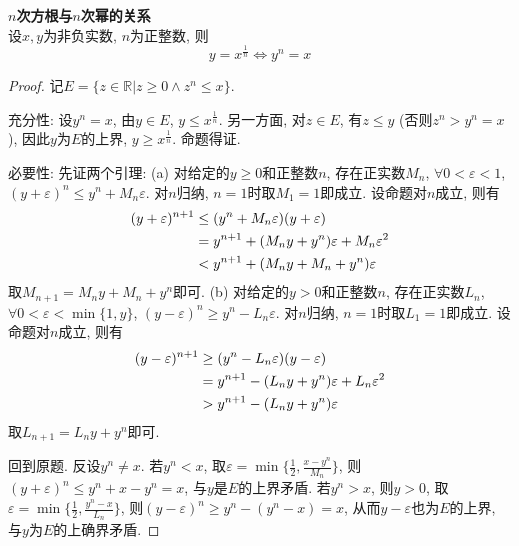 \begin{lem} \textbf{$n$次方根与$n$次幂的关系}\\
设$x,y$为非负实数, $n$为正整数, 则
\begin{equation}
    y = x^{\frac{1}{n}} \iff y^n = x
\end{equation}
\end{lem}
\begin{proof} 记$E=\{z\in \mathbb{R}\vert z\ge 0 \land z^n\le x\}$. 
\par 充分性: 设$y^n=x$, 由$y\in E$, $y\le x^{\frac{1}{n}}$. 另一方面, 对$z\in E$, 有$z\le y$ (否则$z^n>y^n=x$), 因此$y$为$E$的上界, $y\ge x^{\frac{1}{n}}$. 命题得证. 
\par 必要性: 先证两个引理: (a) 对给定的$y\ge 0$和正整数$n$, 存在正实数$M_n$, $\forall 0<\varepsilon<1$, $(y+\varepsilon)^n \le y^n+M_n \varepsilon$. 对$n$归纳, $n=1$时取$M_1=1$即成立. 设命题对$n$成立, 则有
\begin{align}
    (y+\varepsilon)^{n+1}&\le (y^n+M_n\varepsilon)(y+\varepsilon)\notag\\
    &=y^{n+1} + (M_ny+y^n)\varepsilon + M_n \varepsilon^2\notag\\
    &< y^{n+1} + (M_ny+M_n+y^n)\varepsilon
\end{align}
取$M_{n+1}=M_ny+M_n+y^n$即可.  (b) 对给定的$y>0$和正整数$n$, 存在正实数$L_n$, $\forall 0<\varepsilon<\min\{1,y\}$, $(y-\varepsilon)^n \ge y^n-L_n \varepsilon$. 对$n$归纳, $n=1$时取$L_1=1$即成立. 设命题对$n$成立, 则有
\begin{align}
    (y-\varepsilon)^{n+1}&\ge (y^n-L_n\varepsilon)(y-\varepsilon)\notag\\
    &=y^{n+1} - (L_ny+y^n)\varepsilon + L_n \varepsilon^2\notag\\
    &> y^{n+1} - (L_ny+y^n)\varepsilon
\end{align}
取$L_{n+1}=L_ny+y^n$即可. 
\par 回到原题. 反设$y^n\neq x$. 若$y^n<x$, 取$\varepsilon=\min\{\frac{1}{2}, \frac{x-y^n}{M_n}\}$, 则$(y+\varepsilon)^n\le y^n +  x-y^n = x$, 与$y$是$E$的上界矛盾. 若$y^n>x$, 则$y>0$, 取$\varepsilon=\min\{\frac{1}{2}, \frac{y^n-x}{L_n}\}$, 则$(y-\varepsilon)^n\ge  y^n -  (y^n-x) = x$, 从而$y-\varepsilon$也为$E$的上界, 与$y$为$E$的上确界矛盾. 
\end{proof} 

